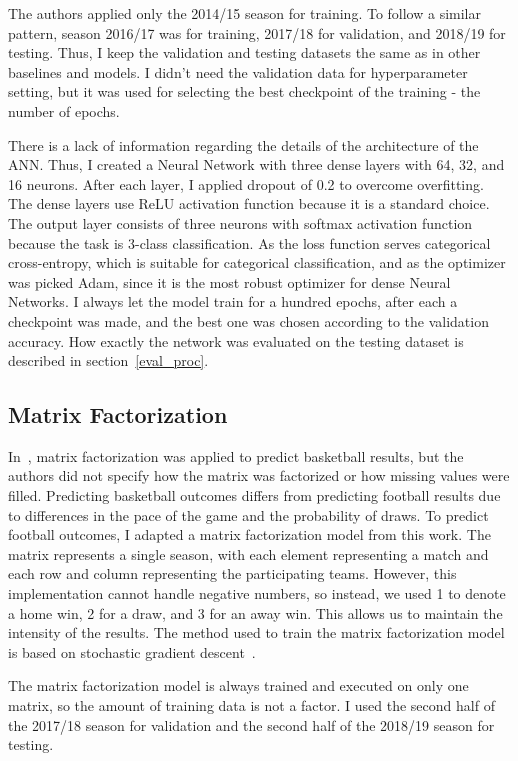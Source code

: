 \documentclass[thesis=M,english]{FITthesis}[2019/12/23]
\begin{document}
The authors applied only the 2014/15 season for training. To follow a similar pattern, season 2016/17 was for training, 2017/18 for validation, and 2018/19 for testing. Thus, I keep the validation and testing datasets the same as in other baselines and models. I didn't need the validation data for hyperparameter setting, but it was used for selecting the best checkpoint of the training - the number of epochs.

There is a lack of information regarding the details of the architecture of the ANN. Thus, I created a Neural Network with three dense layers with 64, 32, and 16 neurons. After each layer, I applied dropout of 0.2 to overcome overfitting. The dense layers use ReLU activation function because it is a standard choice. The output layer consists of three neurons with softmax activation function because the task is 3-class classification. As the loss function serves categorical cross-entropy, which is suitable for categorical classification, and as the optimizer was picked Adam, since it is the most robust optimizer for dense Neural Networks. I always let the model train for a hundred epochs, after each a checkpoint was made, and the best one was chosen according to the validation accuracy. How exactly the network was evaluated on the testing dataset is described in section~\ref{eval_proc}.

\subsection{Matrix Factorization}
In~\cite{NBA_matrix_factorization}, matrix factorization was applied to predict basketball results, but the authors did not specify how the matrix was factorized or how missing values were filled. Predicting basketball outcomes differs from predicting football results due to differences in the pace of the game and the probability of draws. To predict football outcomes, I adapted a matrix factorization model from this work. The matrix represents a single season, with each element representing a match and each row and column representing the participating teams. However, this implementation cannot handle negative numbers, so instead, we used 1 to denote a home win, 2 for a draw, and 3 for an away win. This allows us to maintain the intensity of the results. The method used to train the matrix factorization model is based on stochastic gradient descent~\cite{mf_impl}.

The matrix factorization model is always trained and executed on only one matrix, so the amount of training data is not a factor. I used the second half of the 2017/18 season for validation and the second half of the 2018/19 season for testing.
\end{document}
